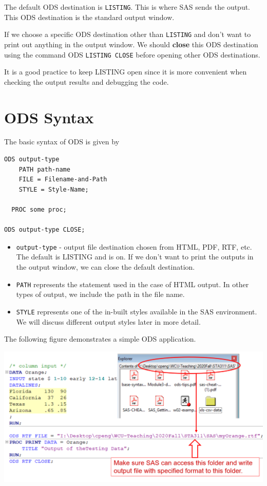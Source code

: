 \documentclass[
]{book}
\begin{document}
The default ODS destination is \texttt{LISTING}. This is where SAS sends the output. This ODS destination is the standard output window.

If we choose a specific ODS destination other than \texttt{LISTING} and don't want to print out anything in the output window. We should \textbf{close} this ODS destination using the command ODS \texttt{LISTING\ CLOSE} before opening other ODS destinations.

It is a good practice to keep LISTING open since it is more convenient when checking the output results and debugging the code.

\hypertarget{ods-syntax}{%
\section{ODS Syntax}\label{ods-syntax}}

The basic syntax of ODS is given by

\begin{verbatim}
ODS output-type
    PATH path-name
    FILE = Filename-and-Path
    STYLE = Style-Name;

  PROC some proc;

ODS output-type CLOSE;
\end{verbatim}

\begin{itemize}
\item
  \texttt{output-type} - output file destination chosen from HTML, PDF, RTF, etc. The default is LISTING and is on. If we don't want to print the outputs in the output window, we can close the default destination.
\item
  \texttt{PATH} represents the statement used in the case of HTML output. In other types of output, we include the path in the file name.
\item
  \texttt{STYLE} represents one of the in-built styles available in the SAS environment. We will discuss different output styles later in more detail.
\end{itemize}

The following figure demonstrates a simple ODS application.

\begin{center}\includegraphics[width=1\linewidth]{img12/w12-ods-annotated-example} \end{center}
\end{document}
